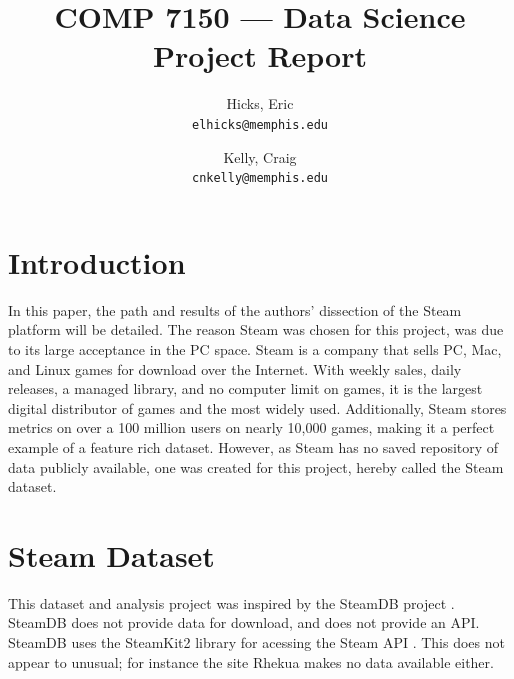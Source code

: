 \documentclass[letterpaper,10pt,twocolumn]{article}
\title{COMP 7150 --- Data Science Project Report}
\author{
    Hicks, Eric\\
    \texttt{elhicks@memphis.edu}
    \and
    Kelly, Craig\\
    \texttt{cnkelly@memphis.edu}
}
\begin{document}
\setlength{\pdfpageheight}{\paperheight}
\setlength{\pdfpagewidth}{\paperwidth}

\maketitle



\section{Introduction}

In this paper, the path and results of the authors' dissection of the Steam
platform will be detailed. The reason Steam was chosen for this project, was
due to its large acceptance in the PC space. Steam is a company that sells
PC, Mac, and Linux games for download over the Internet. With weekly sales,
daily releases, a managed library, and no computer limit on games, it is the
largest digital distributor of games and the most widely used. Additionally,
Steam stores metrics on over a 100 million users on nearly 10,000 games,
making it a perfect example of a feature rich dataset. However, as Steam has
no saved repository of data publicly available, one was created for this
project, hereby called the Steam dataset. \cite{steam}



\section{Steam Dataset}

This dataset and analysis project was inspired by the SteamDB project
\cite{steamdb}. SteamDB does not provide data for download, and does not
provide an API. SteamDB uses the SteamKit2 library \cite{steamkit} for
acessing the Steam API \cite{steamdb-faq}. This does not appear to unusual;
for instance the site Rhekua \cite{rhekua} makes no data available either.
\end{document}
